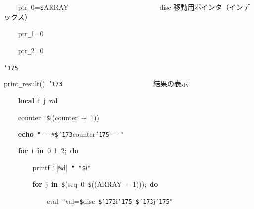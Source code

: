 \documentclass[a4paper,10pt]{article}
\def\mc{\relax}
\begin{document}
\noindent
\mbox{}{\tt\mc \ }{\tt\mc \ }{\tt\mc \ }{\tt\mc \ }ptr{\tt\_}0={\tt\$}ARRAY{\tt\mc \ }{\tt\mc \ }{\tt\mc \ }{\tt\mc \ }{\tt\mc \ }{\tt\mc \ }{\tt\mc \ }{\tt\mc \ }{\tt\mc \ }{\tt\mc \ }{\tt\mc \ }{\tt\mc \ }{\tt\mc \ }{\tt\mc \ }{\tt\mc \ }{\tt\mc \ }{\tt\mc \ }{\tt\mc \ }{\tt\mc \ }{\tt\mc \ }{\tt\mc \ }{\tt\mc \ }{\tt\mc \ }{\tt\mc \ }\rm\mc {\tt\#} \ disc 移動用ポインタ（インデックス）\hfill 
\tt\mc 

\noindent
\mbox{}{\tt\mc \ }{\tt\mc \ }{\tt\mc \ }{\tt\mc \ }ptr{\tt\_}1=0

\noindent
\mbox{}{\tt\mc \ }{\tt\mc \ }{\tt\mc \ }{\tt\mc \ }ptr{\tt\_}2=0

\noindent
\mbox{}{\tt\char'175}

\noindent
\mbox{}\hfill

\noindent
\mbox{}print{\tt\_}result(){\tt\mc \ }{\tt\char'173}{\tt\mc \ }{\tt\mc \ }{\tt\mc \ }{\tt\mc \ }{\tt\mc \ }{\tt\mc \ }{\tt\mc \ }{\tt\mc \ }{\tt\mc \ }{\tt\mc \ }{\tt\mc \ }{\tt\mc \ }{\tt\mc \ }{\tt\mc \ }{\tt\mc \ }{\tt\mc \ }{\tt\mc \ }{\tt\mc \ }{\tt\mc \ }{\tt\mc \ }{\tt\mc \ }{\tt\mc \ }{\tt\mc \ }{\tt\mc \ }\rm\mc {\tt\#} \ 結果の表示 \hfill 
\tt\mc 

\noindent
\mbox{}{\tt\mc \ }{\tt\mc \ }{\tt\mc \ }{\tt\mc \ }\textbf{local}{\tt\mc \ }i{\tt\mc \ }j{\tt\mc \ }val

\noindent
\mbox{}{\tt\mc \ }{\tt\mc \ }{\tt\mc \ }{\tt\mc \ }counter={\tt\$}((counter{\tt\mc \ }+{\tt\mc \ }1))

\noindent
\mbox{}{\tt\mc \ }{\tt\mc \ }{\tt\mc \ }{\tt\mc \ }\textbf{echo}{\tt\mc \ }{\tt "}{\tt -}{\tt -}{\tt -}{\tt\#}{\tt\$}{\tt\char'173}counter{\tt\char'175}{\tt -}{\tt -}{\tt -}{\tt "}

\noindent
\mbox{}{\tt\mc \ }{\tt\mc \ }{\tt\mc \ }{\tt\mc \ }\textbf{for}{\tt\mc \ }i{\tt\mc \ }\textbf{in}{\tt\mc \ }0{\tt\mc \ }1{\tt\mc \ }2;{\tt\mc \ }\textbf{do}

\noindent
\mbox{}{\tt\mc \ }{\tt\mc \ }{\tt\mc \ }{\tt\mc \ }{\tt\mc \ }{\tt\mc \ }{\tt\mc \ }{\tt\mc \ }printf{\tt\mc \ }{\tt "}[{\tt\%}d]{\tt\mc \ }{\tt "}{\tt\mc \ }{\tt "}{\tt\$}i{\tt "}

\noindent
\mbox{}{\tt\mc \ }{\tt\mc \ }{\tt\mc \ }{\tt\mc \ }{\tt\mc \ }{\tt\mc \ }{\tt\mc \ }{\tt\mc \ }\textbf{for}{\tt\mc \ }j{\tt\mc \ }\textbf{in}{\tt\mc \ }{\tt\$}(seq{\tt\mc \ }0{\tt\mc \ }{\tt\$}((ARRAY{\tt\mc \ }{\tt -}{\tt\mc \ }1)));{\tt\mc \ }\textbf{do}

\noindent
\mbox{}{\tt\mc \ }{\tt\mc \ }{\tt\mc \ }{\tt\mc \ }{\tt\mc \ }{\tt\mc \ }{\tt\mc \ }{\tt\mc \ }{\tt\mc \ }{\tt\mc \ }{\tt\mc \ }{\tt\mc \ }eval{\tt\mc \ }{\tt "}val={\tt{}}{\tt\$}disc{\tt\_}{\tt\$}{\tt\char'173}i{\tt\char'175}{\tt\_}{\tt\$}{\tt\char'173}j{\tt\char'175}{\tt "}
\end{document}
